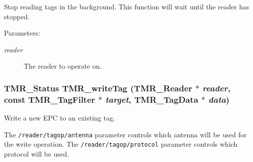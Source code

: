 Stop reading tags in the background. This function will wait until the reader has stopped.

\begin{Desc}
\item[Parameters:]
\begin{description}
\item[{\em reader}]The reader to operate on. \end{description}
\end{Desc}
\hypertarget{group__reader_g8f88f53e5ccb6d17cd430f0d7428f641}{
\subsubsection[{TMR\_\-writeTag}]{\setlength{\rightskip}{0pt plus 5cm}TMR\_\-Status TMR\_\-writeTag ({\bf TMR\_\-Reader} $\ast$ {\em reader}, \/  const {\bf TMR\_\-TagFilter} $\ast$ {\em target}, \/  {\bf TMR\_\-TagData} $\ast$ {\em data})}}
\label{group__reader_g8f88f53e5ccb6d17cd430f0d7428f641}


Write a new EPC to an existing tag.

The {\tt /reader/tagop/antenna} parameter controls which antenna will be used for the write operation. The {\tt /reader/tagop/protocol} parameter controls which protocol will be used.

